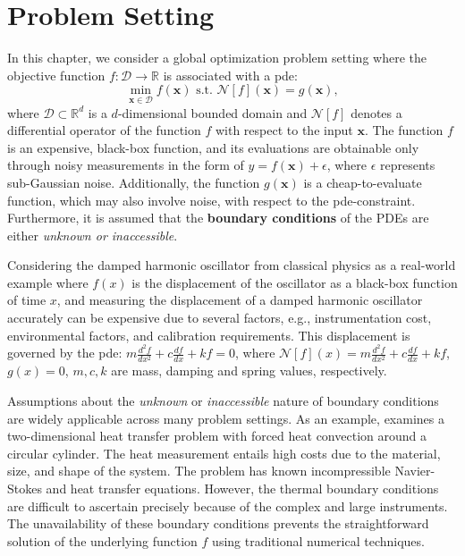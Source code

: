 \section{Problem Setting}
\label{section:pinn-bo_problem_setting}
In this chapter, we consider a global optimization problem setting where the objective function $f \colon \mathcal{D} \rightarrow \mathbb{R}$ is associated with a \ac{pde}:   
\begin{equation*}
        \underset{\mathbf{x} \in \mathcal{D}}{\min} f(\mathbf{x}) \text{ s.t. }  \mathcal{N}[f](\mathbf{x}) = g(\mathbf{x}),
\end{equation*} 
where $\mathcal{D} \subset \mathbb{R}^d$ is a $d$-dimensional bounded domain and $\mathcal{N}[f]$ denotes a differential operator of the function $f$ with respect to the input $\mathbf{x}$. The function $f$ is an expensive, black-box function, and its evaluations are obtainable only through noisy measurements in the form of $y = f(\mathbf{x}) + \epsilon$, where $\epsilon$ represents sub-Gaussian noise. Additionally, the function $g(\mathbf{x})$ is a cheap-to-evaluate function, which may also involve noise, with respect to the \ac{pde}-constraint. Furthermore, it is assumed that the \textbf{boundary conditions} of the PDEs are either \textit{unknown or inaccessible}.
\begin{remark}
    Considering the damped harmonic oscillator from classical physics as a real-world example where $f(x)$ is the displacement of the oscillator as a black-box function of time $x$, and measuring the displacement of a damped harmonic oscillator accurately can be expensive due to several factors, e.g., instrumentation cost, environmental factors, and calibration requirements. This displacement is governed by the \ac{pde}: $m \frac{d^2f}{dx^2} + c \frac{df}{dx} + kf = 0$, where $\mathcal{N}[f](x) = m \frac{d^2f}{dx^2} + c \frac{df}{dx} + kf$, $g(x)=0$, $m, c, k$ are mass, damping and spring values, respectively. 
\end{remark}
\begin{remark}
    Assumptions about the \textit{unknown} or \textit{inaccessible} nature of boundary conditions are widely applicable across many problem settings. As an example, \citet{cai2020heat} examines a two-dimensional heat transfer problem with forced heat convection around a circular cylinder. The heat measurement entails high costs due to the material, size, and shape of the system. The problem has known incompressible Navier-Stokes and heat transfer equations. However, the thermal boundary conditions are difficult to ascertain precisely because of the complex and large instruments. The unavailability of these boundary conditions prevents the straightforward solution of the underlying function $f$ using traditional numerical techniques.
\end{remark}


